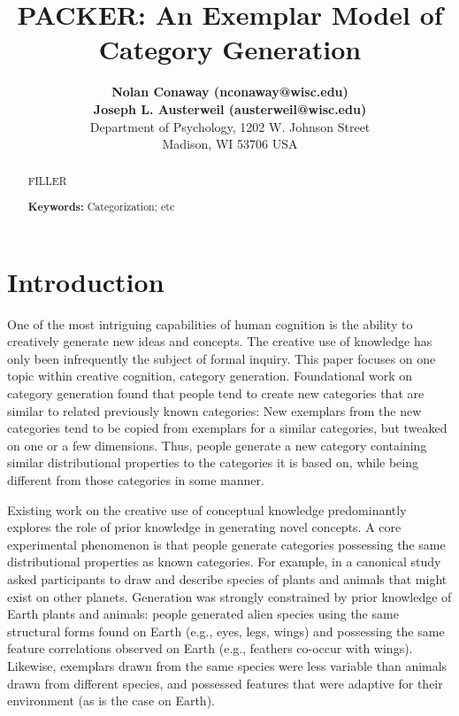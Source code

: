 \documentclass[10pt,letterpaper]{article}
\title{PACKER: An Exemplar Model of Category Generation}
\author{
{ \large \bf Nolan Conaway (nconaway@wisc.edu) } \\
{ \large \bf Joseph L. Austerweil (austerweil@wisc.edu) } \\
Department of Psychology, 1202 W. Johnson Street \\
Madison, WI 53706 USA
}
\begin{document}
\maketitle

\begin{abstract}
FILLER

\textbf{Keywords:} 
Categorization; etc
\end{abstract}

\section{Introduction}

One of the most intriguing capabilities of human cognition is the ability to creatively generate new ideas and concepts. The creative use of knowledge has only been infrequently the subject of formal inquiry. This paper focuses on one topic within creative cognition, category generation. Foundational work on category generation \citep[e.g.,][]{marsh1999inadvertent,smith1993constraining,ward2002role,ward1994structured,ward1995s} found that people tend to create new categories that are similar to related previously known categories: New exemplars from the new categories tend to be copied from exemplars for a similar categories, but tweaked on one or a few dimensions. Thus, people generate a new category containing similar distributional properties to the categories it is based on, while being different from those categories in some manner. 

Existing work on the creative use of conceptual knowledge predominantly explores the role of prior knowledge in generating novel concepts. A core experimental phenomenon is that people generate categories possessing the same distributional properties as known categories. For example, in a canonical study \citet{ward1994structured} asked participants to draw and describe species of plants and animals that might exist on other planets. Generation was strongly constrained by prior knowledge of Earth plants and animals: people generated alien species using the same structural forms found on Earth (e.g., eyes, legs, wings) and possessing the same feature correlations observed on Earth (e.g., feathers co-occur with wings). Likewise, exemplars drawn from the same species were less variable than animals drawn from different species, and possessed features that were adaptive for their environment (as is the case on Earth).
\end{document}
